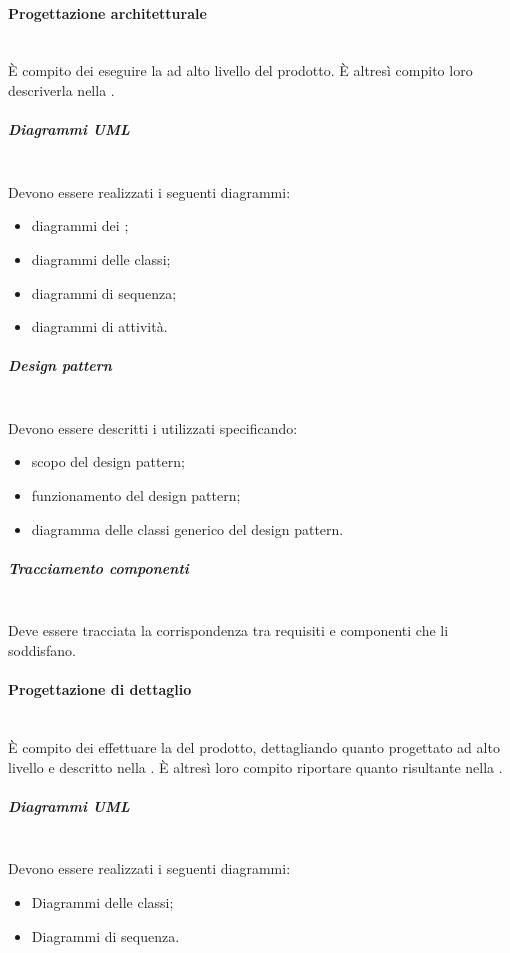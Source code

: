 \paragraph{Progettazione architetturale}\mbox{}\\
\`{E} compito dei \Progettisti{} eseguire la \PA{} ad alto livello del prodotto. È altresì compito loro descriverla nella \SpecificaTecnica.

\subparagraph{Diagrammi UML}\mbox{}\\
Devono essere realizzati i seguenti diagrammi:
\begin{itemize}
	\item diagrammi dei ;
	\item diagrammi delle classi;
	\item diagrammi di sequenza;
	\item diagrammi di attività.
\end{itemize}

\subparagraph{Design pattern}\mbox{}\\
Devono essere descritti i  utilizzati specificando:
\begin{itemize}
	\item scopo del design pattern;
	\item funzionamento del design pattern;
	\item diagramma delle classi generico del design pattern.
\end{itemize}

\subparagraph{Tracciamento componenti}\mbox{}\\
Deve essere tracciata la corrispondenza tra requisiti e componenti che li soddisfano.

\paragraph{Progettazione di dettaglio}\mbox{}\\
\`{E} compito dei \Progettisti{} effettuare la \PD{} del prodotto, dettagliando quanto progettato ad alto livello e descritto nella \SpecificaTecnica{}. È altresì loro compito riportare quanto risultante nella \DefinizioneDiProdotto{}.

\subparagraph{Diagrammi UML}\mbox{}\\
Devono essere realizzati i seguenti diagrammi:
\begin{itemize}
	\item Diagrammi delle classi;
	\item Diagrammi di sequenza.
\end{itemize}

